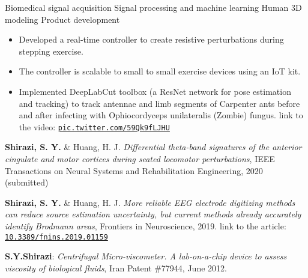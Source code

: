 \begin{outline}
    \1 Biomedical signal acquisition
    \1 Signal processing and machine learning
    \1 Human 3D modeling
    \1 Product development
    
\end{outline}

\begin{itemize}
\item Developed a real-time controller to create resistive perturbations during stepping exercise.
\item The controller is scalable to small to small exercise devices using an IoT kit.
\end{itemize}
\smallskip
{}
\begin{itemize}
\item Implemented DeepLabCut toolbox (a ResNet network for pose estimation and tracking) to track antennae and limb segments of Carpenter ants before and after infecting with Ophiocordyceps unilateralis (Zombie) fungus. {\footnotesize{link to the video:} {\tt{\href{https://pic.twitter.com/59Qk9fLJHU}{pic.twitter.com/59Qk9fLJHU}}}}
\end{itemize}

\smallskip
\textbf{Shirazi, S. Y.} \& Huang, H. J. \textit{Differential theta-band signatures of the anterior cingulate and motor cortices during seated locomotor perturbations}, IEEE Transactions on Neural Systems and Rehabilitation Engineering, 2020 (submitted)
\smallskip
\vspace{1ex}

\textbf{Shirazi, S. Y.} \& Huang, H. J. \textit{More reliable EEG electrode digitizing methods can reduce source estimation uncertainty, but current methods already accurately identify Brodmann areas}, Frontiers in Neuroscience, 2019. {\footnotesize{link to the article:} {\tt{\href{https://www.frontiersin.org/articles/10.3389/fnins.2019.01159/}{10.3389/fnins.2019.01159}}}}

\textbf{S.Y.Shirazi}: \textit{Centrifugal Micro-viscometer. A lab-on-a-chip device to assess viscosity of biological fluids}, Iran Patent \#77944, June 2012.
